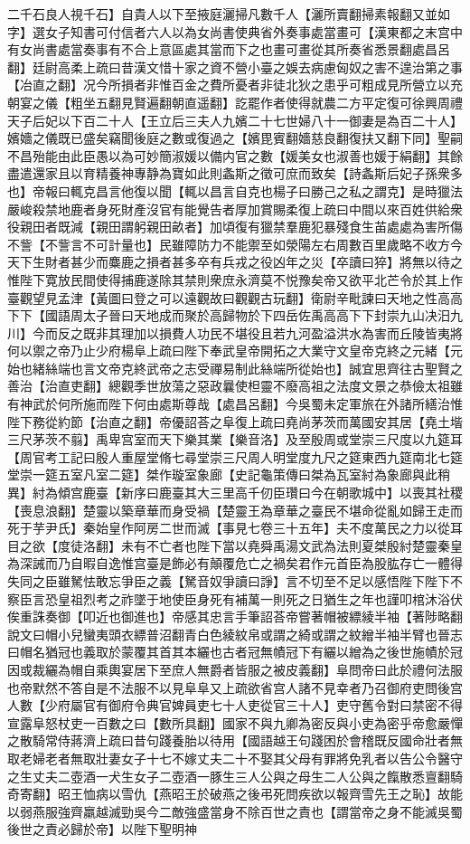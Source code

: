 二千石良人視千石】自貴人以下至掖庭灑掃凡數千人【灑所賣翻掃素報翻又並如字】選女子知書可付信者六人以為女尚書使典省外奏事處當畫可【漢東都之末宫中有女尚書處當奏事有不合上意區處其當而下之也畫可畫從其所奏省悉景翻處昌呂翻】廷尉高柔上疏曰昔漢文惜十家之資不營小臺之娛去病慮匈奴之害不遑治第之事【冶直之翻】况今所損者非惟百金之費所憂者非徒北狄之患乎可粗成見所營立以充朝宴之儀【粗坐五翻見賢遍翻朝直遥翻】訖罷作者使得就農二方平定復可徐興周禮天子后妃以下百二十人【王立后三夫人九嬪二十七世婦八十一御妻是為百二十人】嬪嬙之儀既已盛矣竊聞後庭之數或復過之【嬪毘賓翻嬙慈良翻復扶又翻下同】聖嗣不昌殆能由此臣愚以為可妙簡淑媛以備内官之數【媛美女也淑善也媛于絹翻】其餘盡遣還家且以育精養神專静為寶如此則螽斯之徵可庶而致矣【詩螽斯后妃子孫衆多也】帝報曰輒克昌言他復以聞【輒以昌言自克也楊子曰勝己之私之謂克】是時獵法嚴峻殺禁地鹿者身死財產沒官有能覺告者厚加賞賜柔復上疏曰中間以來百姓供給衆役親田者既減【親田謂躬親田畝者】加頃復有獵禁羣鹿犯暴殘食生苖處處為害所傷不訾【不訾言不可計量也】民雖障防力不能禦至如滎陽左右周數百里歲略不收方今天下生財者甚少而麋鹿之損者甚多卒有兵戎之役凶年之災【卒讀曰猝】將無以待之惟陛下寛放民間使得捕鹿遂除其禁則衆庶永濟莫不悦豫矣帝又欲平北芒令於其上作臺觀望見孟津【黃圖曰登之可以遠觀故曰觀觀古玩翻】衛尉辛毗諫曰天地之性高高下下【國語周太子晉曰天地成而聚於高歸物於下四岳佐禹高高下下封崇九山决汨九川】今而反之既非其理加以損費人功民不堪役且若九河盈溢洪水為害而丘陵皆夷將何以禦之帝乃止少府楊阜上疏曰陛下奉武皇帝開拓之大業守文皇帝克終之元緒【元始也緒絲端也言文帝克終武帝之志受禪易制此絲端所從始也】誠宜思齊往古聖賢之善治【治直吏翻】總觀季世放蕩之惡政曩使柦靈不廢高祖之法度文景之恭儉太祖雖有神武於何所施而陛下何由處斯尊哉【處昌呂翻】今吳蜀未定軍旅在外諸所繕治惟陛下務從約節【治直之翻】帝優詔荅之阜復上疏曰堯尚茅茨而萬國安其居【堯土堦三尺茅茨不翦】禹卑宫室而天下樂其業【樂音洛】及至殷周或堂崇三尺度以九筵耳【周官考工記曰殷人重屋堂脩七尋堂崇三尺周人明堂度九尺之筵東西九筵南北七筵堂崇一筵五室凡室二筵】桀作璇室象廊【史記龜策傳曰桀為瓦室紂為象廊與此稍異】紂為傾宫鹿臺【新序曰鹿臺其大三里高千仞臣瓚曰今在朝歌城中】以喪其社稷【喪息浪翻】楚靈以築章華而身受禍【楚靈王為章華之臺民不堪命從亂如歸王走而死于芋尹氏】秦始皇作阿房二世而滅【事見七卷三十五年】夫不度萬民之力以從耳目之欲【度徒洛翻】未有不亡者也陛下當以堯舜禹湯文武為法則夏桀殷紂楚靈秦皇為深誡而乃自暇自逸惟宫臺是飾必有顛覆危亡之禍矣君作元首臣為股肱存亡一體得失同之臣雖駑怯敢忘爭臣之義【駑音奴爭讀曰諍】言不切至不足以感悟陛下陛下不察臣言恐皇祖烈考之祚墜于地使臣身死有補萬一則死之日猶生之年也謹叩棺沐浴伏俟重誅奏御【叩近也御進也】帝感其忠言手筆詔荅帝嘗著帽被縹綾半袖【著陟略翻說文曰帽小兒蠻夷頭衣縹普沼翻青白色綾紋帛或謂之綺或謂之紋繒半袖半臂也晉志曰帽名猶冠也義取於蒙覆其首其本纚也古者冠無幘冠下有纚以繒為之後世施幘於冠因或裁纚為帽自乘輿宴居下至庶人無爵者皆服之被皮義翻】阜問帝曰此於禮何法服也帝默然不答自是不法服不以見阜阜又上疏欲省宫人諸不見幸者乃召御府吏問後宫人數【少府屬官有御府令典官婢員吏七十人吏從官三十人】吏守舊令對曰禁密不得宣露阜怒杖吏一百數之曰【數所具翻】國家不與九卿為密反與小吏為密乎帝愈嚴憚之散騎常侍蔣濟上疏曰昔句踐養胎以待用【國語越王句踐困於會稽既反國命壯者無取老婦老者無取壯妻女子十七不嫁丈夫二十不娶其父母有罪將免乳者以告公令醫守之生丈夫二壺酒一犬生女子二壺酒一豚生三人公與之母生二人公與之餼散悉亶翻騎奇寄翻】昭王恤病以雪仇【燕昭王於破燕之後弔死問疾欲以報齊雪先王之恥】故能以弱燕服強齊羸越滅勁吳今二敵強盛當身不除百世之責也【謂當帝之身不能滅吳蜀後世之責必歸於帝】以陛下聖明神